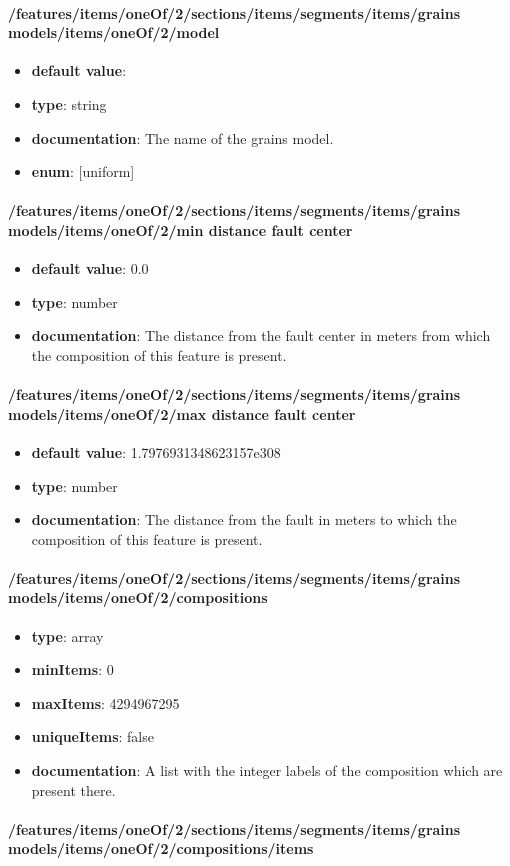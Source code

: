 \paragraph{/features/items/oneOf/2/sections/items/segments/items/grains models/items/oneOf/2/model}
\begin{itemize}\item {\bf default value}: 
\item {\bf type}: string
\item {\bf documentation}: The name of the grains model.
\item {\bf enum}: [uniform]\end{itemize}\paragraph{/features/items/oneOf/2/sections/items/segments/items/grains models/items/oneOf/2/min distance fault center}
\begin{itemize}\item {\bf default value}: 0.0
\item {\bf type}: number
\item {\bf documentation}: The distance from the fault center in meters from which the composition of this feature is present.
\end{itemize}\paragraph{/features/items/oneOf/2/sections/items/segments/items/grains models/items/oneOf/2/max distance fault center}
\begin{itemize}\item {\bf default value}: 1.7976931348623157e308
\item {\bf type}: number
\item {\bf documentation}: The distance from the fault in meters to which the composition of this feature is present.
\end{itemize}\paragraph{/features/items/oneOf/2/sections/items/segments/items/grains models/items/oneOf/2/compositions}
\begin{itemize}\item {\bf type}: array
\item {\bf minItems}: 0
\item {\bf maxItems}: 4294967295
\item {\bf uniqueItems}: false
\item {\bf documentation}: A list with the integer labels of the composition which are present there.
\end{itemize}\paragraph{/features/items/oneOf/2/sections/items/segments/items/grains models/items/oneOf/2/compositions/items}
